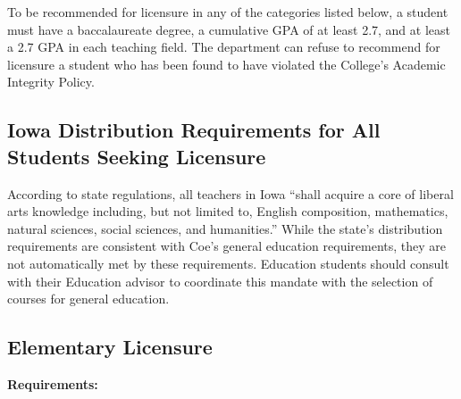 \documentclass[
  letterpaper,
]{scrbook}
\begin{document}
To be recommended for licensure in any of the categories listed below, a
student must have a baccalaureate degree, a cumulative GPA of at least
2.7, and at least a 2.7 GPA in each teaching field. The department can
refuse to recommend for licensure a student who has been found to have
violated the College's Academic Integrity Policy.

\subsection{Iowa Distribution Requirements for All Students Seeking
Licensure}\label{iowa-distribution-requirements-for-all-students-seeking-licensure}

According to state regulations, all teachers in Iowa ``shall acquire a
core of liberal arts knowledge including, but not limited to, English
composition, mathematics, natural sciences, social sciences, and
humanities.'' While the state's distribution requirements are consistent
with Coe's general education requirements, they are not automatically
met by these requirements. Education students should consult with their
Education advisor to coordinate this mandate with the selection of
courses for general education.

\subsection{Elementary Licensure}\label{elementary-licensure}

\textbf{Requirements:}
\end{document}
